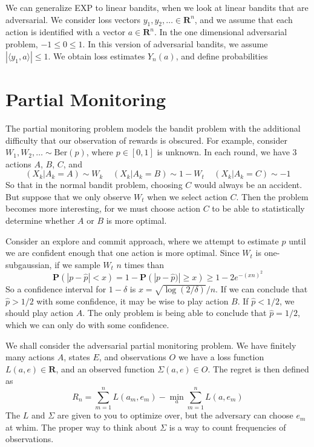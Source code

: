 We can generalize EXP to linear bandits, when we look at linear bandits that are adversarial. We consider loss vectors $y_1, y_2, \dots \in \mathbf{R}^n$, and we assume that each action is identified with a vector $a \in \mathbf{R}^n$. In the one dimensional adversarial problem, $-1 \leq 0 \leq 1$. In this version of adversarial bandits, we assume $|\langle y_1, a \rangle| \leq 1$. We obtain loss estimates $\hat{Y}_n(a)$, and define probabilities

\chapter{Partial Monitoring}

The partial monitoring problem models the bandit problem with the additional difficulty that our observation of rewards is obscured. For example, consider $W_1, W_2, \dots \sim \text{Ber}(p)$, where $p \in [0,1]$ is unknown. In each round, we have 3 actions $A$, $B$, $C$, and
%
\[ (X_k | A_k = A) \sim W_k\ \ \ \ \ (X_k | A_k = B) \sim 1 - W_t\ \ \ \ \ (X_k | A_k = C) \sim -1 \]
%
So that in the normal bandit problem, choosing $C$ would always be an accident. But suppose that we only observe $W_t$ when we select action $C$. Then the problem becomes more interesting, for we must choose action $C$ to be able to statistically determine whether $A$ or $B$ is more optimal.

Consider an explore and commit approach, where we attempt to estimate $p$ until we are confident enough that one action is more optimal. Since $W_t$ is one-subgaussian, if we sample $W_t$ $n$ times than
%
\[ \mathbf{P}(|p - \widehat{p}| < x) = 1 - \mathbf{P}(|p - \widehat{p})| \geq x) \geq 1 - 2e^{-(xn)^2} \]
%
So a confidence interval for $1 - \delta$ is $x = \sqrt{\log(2/\delta)}/n$. If we can conclude that $\widehat{p} > 1/2$ with some confidence, it may be wise to play action $B$. If $\widehat{p} < 1/2$, we should play action $A$. The only problem is being able to conclude that $\widehat{p} = 1/2$, which we can only do with some confidence.

We shall consider the adversarial partial monitoring problem. We have finitely many actions $A$, states $E$, and observations $O$ we have a loss function $L(a,e) \in \mathbf{R}$, and an observed function $\Sigma(a,e) \in O$. The regret is then defined as
%
\[ R_n = \sum_{m = 1}^n L(a_m,e_m) - \min_a \sum_{m = 1}^n L(a,e_m) \]
%
The $L$ and $\Sigma$ are given to you to optimize over, but the adversary can choose $e_m$ at whim. The proper way to think about $\Sigma$ is a way to count frequencies of observations.

